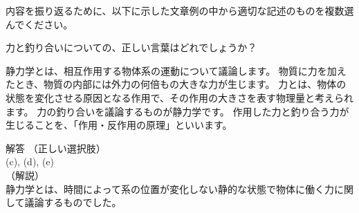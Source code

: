 \documentclass[uplatex,dvipdfmx,a4paper,11pt]{jsarticle}
\begin{document}
内容を振り返るために、以下に示した文章例の中から適切な記述のものを複数選んでください。
	\begin{qlist}
		\qitem 力と釣り合いについての、正しい言葉はどれでしょうか？
		\begin{qlist2}
			\qitem 静力学とは、相互作用する物体系の運動について議論します。
			\qitem 物質に力を加えたとき、物質の内部には外力の何倍もの大きな力が生じます。
			\qitem 力とは、物体の状態を変化させる原因となる作用で、その作用の大きさを表す物理量と考えられます。
			\qitem 力の釣り合いを議論するものが静力学です。
			\qitem 作用した力と釣り合う力が生じることを、「作用・反作用の原理」といいます。
		\end{qlist2}
    \vspace{3mm}
    \begin{itembox}[l]{解答}
        （正しい選択肢）\\
        (c), (d), (e)\\
        （解説）\\
        静力学とは、時間によって系の位置が変化しない静的な状態で物体に働く力に関して議論するものでした。


\end{itembox}
\end{qlist}
\end{document}
